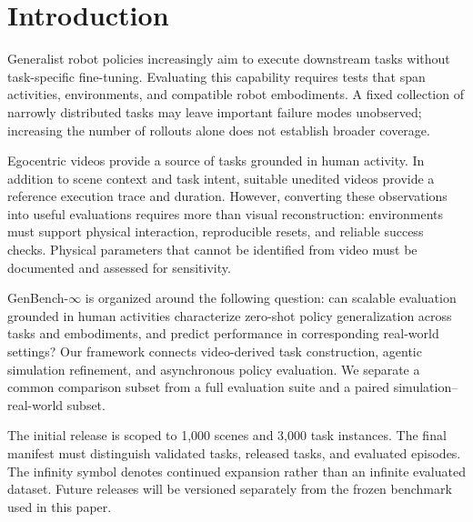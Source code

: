 \section{Introduction}
\label{sec:intro}




Generalist robot policies increasingly aim to execute downstream tasks without task-specific fine-tuning. Evaluating this capability requires tests that span activities, environments, and compatible robot embodiments. A fixed collection of narrowly distributed tasks may leave important failure modes unobserved; increasing the number of rollouts alone does not establish broader coverage.

Egocentric videos provide a source of tasks grounded in human activity. In addition to scene context and task intent, suitable unedited videos provide a reference execution trace and duration. However, converting these observations into useful evaluations requires more than visual reconstruction: environments must support physical interaction, reproducible resets, and reliable success checks. Physical parameters that cannot be identified from video must be documented and assessed for sensitivity.

GenBench-$\infty$ is organized around the following question: can scalable evaluation grounded in human activities characterize zero-shot policy generalization across tasks and embodiments, and predict performance in corresponding real-world settings? Our framework connects video-derived task construction, agentic simulation refinement, and asynchronous policy evaluation. We separate a common comparison subset from a full evaluation suite and a paired simulation--real-world subset.

The initial release is scoped to 1,000 scenes and 3,000 task instances. The final manifest must distinguish validated tasks, released tasks, and evaluated episodes. The infinity symbol denotes continued expansion rather than an infinite evaluated dataset. Future releases will be versioned separately from the frozen benchmark used in this paper.

